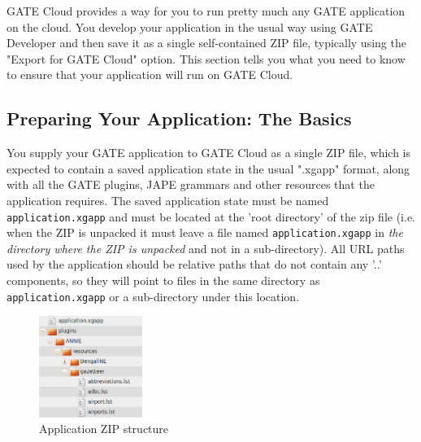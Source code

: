 
GATE Cloud provides a way for you to run pretty much any GATE application on
the cloud.  You develop your application in the usual way using GATE Developer
and then save it as a single self-contained ZIP file, typically using the
"Export for GATE Cloud" option.  This section tells you
what you need to know to ensure that your application will run on
GATE Cloud.

\subsection{Preparing Your Application: The Basics}

You supply your GATE application to GATE Cloud as a single ZIP file, which
is expected to contain a saved application state in the usual ".xgapp" format,
along with all the GATE plugins, JAPE grammars and other resources that the
application requires.  The saved application state must be named
{\tt application.xgapp} and must be located at the 'root directory' of the zip file
(i.e. when the ZIP is unpacked it must leave a file named {\tt application.xgapp}
in \emph{the directory where the ZIP is unpacked} and not in a sub-directory).
All URL paths used by the application should be relative paths that do not
contain any '..' components, so they will point to files in the same directory
as {\tt application.xgapp} or a sub-directory under this location.

\begin{figure}[htbp]
\begin{center}
\includegraphics[width=0.3\textwidth]{app-zip-structure.png}
\end{center}
\caption{Application ZIP structure}
\label{fig:cloudappzipstructure}
\end{figure}

